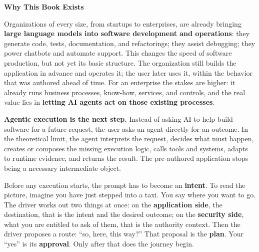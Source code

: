 \documentclass[10pt,oneside,openany]{book}
\begin{document}
{\sffamily\bfseries\Large Why This Book Exists\par}
\vspace{0.06in}

{\small{}\setlength{\parskip}{1.2pt}
Organizations of every size, from startups to enterprises, are already bringing \textbf{large language models into software development and operations}: they generate code, tests, documentation, and refactorings; they assist debugging; they power chatbots and automate support. This changes the speed of software production, but not yet its basic structure. The organization still builds the application in advance and operates it; the user later uses it, within the behavior that was authored ahead of time. For an enterprise the stakes are higher: it already runs business processes, know-how, services, and controls, and the real value lies in \textbf{letting AI agents act on those existing processes}.

\textbf{Agentic execution is the next step.} Instead of asking AI to help build software for a future request, the user asks an agent directly for an outcome. In the theoretical limit, the agent interprets the request, decides what must happen, creates or composes the missing execution logic, calls tools and systems, adapts to runtime evidence, and returns the result. The pre-authored application stops being a necessary intermediate object.

Before any execution starts, the prompt has to become an \textbf{intent}. To read the picture, imagine you have just stepped into a taxi. You say where you want to go. The driver works out two things at once: on the \textbf{application side}, the destination, that is the intent and the desired outcome; on the \textbf{security side}, what you are entitled to ask of them, that is the authority context. Then the driver proposes a route: ``so, here, this way?'' That proposal is the \textbf{plan}. Your ``yes'' is its \textbf{approval}. Only after that does the journey begin.

}
\end{document}
